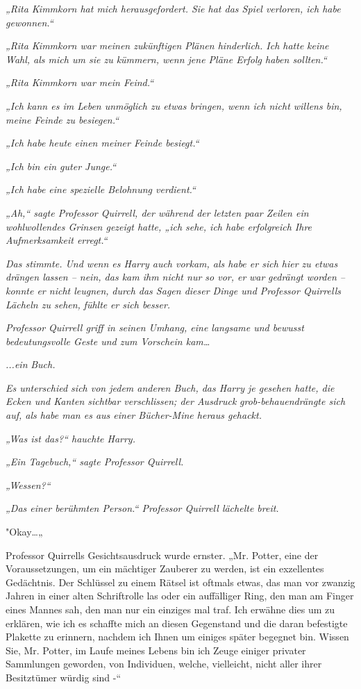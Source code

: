 {\emph{„Rita Kimmkorn hat mich herausgefordert. Sie hat das Spiel verloren, ich habe gewonnen.“}

\emph{„Rita Kimmkorn war meinen zukünftigen Plänen hinderlich. Ich hatte} \emph{keine Wahl, als mich um sie zu kümmern, wenn jene Pläne Erfolg haben sollten.“}

\emph{„Rita Kimmkorn war mein Feind.“}

\emph{„Ich kann es im Leben unmöglich zu etwas bringen, wenn ich nicht willens bin, meine Feinde zu besiegen.“}

\emph{„Ich habe heute einen meiner Feinde besiegt.“}

\emph{„Ich bin ein guter Junge.“}

\emph{„Ich habe eine spezielle Belohnung verdient.“}

\emph{„Ah,“ sagte Professor Quirrell, der während der letzten paar Zeilen ein wohlwollendes Grinsen gezeigt hatte, „ich sehe, ich habe erfolgreich Ihre Aufmerksamkeit erregt.“}

\emph{Das stimmte. Und wenn es Harry auch vorkam, als habe er sich hier zu etwas drängen lassen -- nein, das kam ihm nicht nur so vor, er} \emph{\emph{war}} \emph{gedrängt worden -- konnte er nicht leugnen,} \emph{durch das Sagen dieser Dinge und Professor Quirrells Lächeln zu sehen,} \emph{\emph{fühlte}} \emph{er sich besser.}

\emph{Professor Quirrell griff in seinen Umhang, eine langsame und bewusst bedeutungsvolle Geste und zum Vorschein kam…}

\emph{...ein} \emph{\emph{Buch.}}

\emph{Es unterschied sich von jedem anderen Buch, das Harry je gesehen hatte, die Ecken und Kanten sichtbar verschlissen; der Ausdruck} \emph{\emph{grob-behauen}drängte sich auf, als habe man es aus einer Bücher-Mine heraus gehackt.}

\emph{„Was ist das?“ hauchte Harry.}

\emph{„Ein Tagebuch,“ sagte Professor Quirrell.}

\emph{„Wessen?“}

\emph{„Das einer berühmten Person.“ Professor Quirrell lächelte breit.}

"Okay…„

Professor Quirrells Gesichtsausdruck wurde ernster. „Mr. Potter, eine der Voraussetzungen, um ein mächtiger Zauberer zu werden, ist ein exzellentes Gedächtnis. Der Schlüssel zu einem Rätsel ist oftmals etwas, das man vor zwanzig Jahren in einer alten Schriftrolle las oder ein auffälliger Ring, den man am Finger eines Mannes sah, den man nur ein einziges mal traf. Ich erwähne dies um zu erklären, wie ich es schaffte mich an diesen Gegenstand und die daran befestigte Plakette zu erinnern, nachdem ich Ihnen um einiges später begegnet bin. Wissen Sie, Mr. Potter, im Laufe meines Lebens bin ich Zeuge einiger privater Sammlungen geworden, von Individuen, welche, vielleicht, nicht aller ihrer Besitztümer würdig sind -“

}
